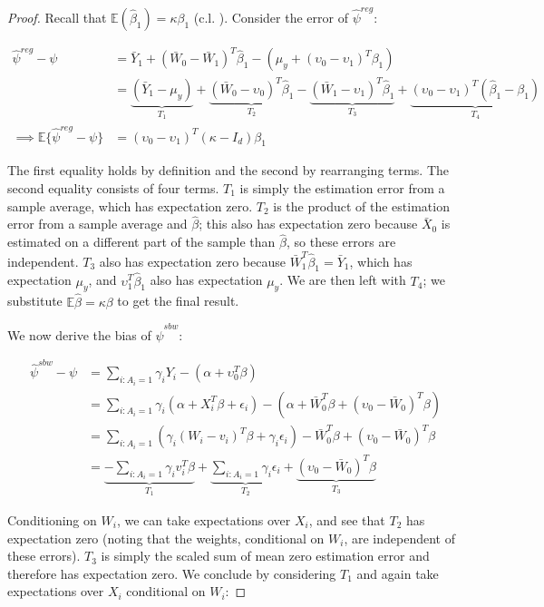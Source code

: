 \begin{proof}
Recall that $\mathbb{E}(\hat{\beta}_1) = \kappa\beta_1$ (c.l. \cite{gleser1992importance}). Consider the error of $\hat{\psi}^{reg}$: 

\begin{align*}
    \hat{\psi}^{reg} - \psi &= \bar{Y}_1 + (\bar{W}_0 - \bar{W}_1)^T\hat{\beta}_1 - (\mu_y + (\upsilon_0 - \upsilon_1)^T\beta_1) \\
    &= \underbrace{(\bar{Y}_1 - \mu_y)}_{T_1} + \underbrace{(\bar{W}_0 - \upsilon_0)^T\hat{\beta}_1}_{T_2} - \underbrace{(\bar{W}_1 - \upsilon_1)^T\hat{\beta}_1}_{T_3} + \underbrace{(\upsilon_0 - \upsilon_1)^T(\hat{\beta}_1 - \beta_1)}_{T_4} \\
    \implies \mathbb{E}\{\hat{\psi}^{reg} - \psi\} &= (\upsilon_0 - \upsilon_1)^T(\kappa - I_d)\beta_1
\end{align*}

The first equality holds by definition and the second by rearranging terms. The second equality consists of four terms. $T_1$ is simply the estimation error from a sample average, which has expectation zero. $T_2$ is the product of the estimation error from a sample average and $\hat{\beta}$; this also has expectation zero because $\bar{X}_0$ is estimated on a different part of the sample than $\hat{\beta}$, so these errors are independent. $T_3$ also has expectation zero because $\bar{W}_1^T\hat{\beta}_1 = \bar{Y}_1$, which has expectation $\mu_y$, and $\upsilon_1^T\hat{\beta}_1$ also has expectation $\mu_y$. We are then left with $T_4$; we substitute $\mathbb{E}{\hat{\beta}} = \kappa\beta$ to get the final result. 

We now derive the bias of $\hat{\psi}^{sbw}$:

\begin{align*}
    \hat{\psi}^{sbw} - \psi &= \sum_{i: A_i = 1}\gamma_iY_i - (\alpha + \upsilon_0^T\beta) \\
    &= \sum_{i: A_i = 1} \gamma_i(\alpha + X_i^T\beta + \epsilon_i) - (\alpha + \bar{W}_0^T\beta + (\upsilon_0 - \bar{W}_0)^T\beta) \\
    &= \sum_{i: A_i = 1} (\gamma_i(W_i - v_i)^T\beta + \gamma_i\epsilon_i) - \bar{W}_0^T\beta + (\upsilon_0 - \bar{W}_0)^T\beta \\
    &= \underbrace{-\sum_{i: A_i = 1}\gamma_iv_i^T\beta}_{T_1} + \underbrace{\sum_{i: A_i = 1}\gamma_i\epsilon_i}_{T_2}  + \underbrace{(\upsilon_0 - \bar{W}_0)^T\beta}_{T_3}
\end{align*}

Conditioning on $W_i$, we can take expectations over $X_i$, and see that $T_2$ has expectation zero (noting that the weights, conditional on $W_i$, are independent of these errors). $T_3$ is simply the scaled sum of mean zero estimation error and therefore has expectation zero. We conclude by considering $T_1$ and again take expectations over $X_i$ conditional on $W_i$: 


\end{proof}
